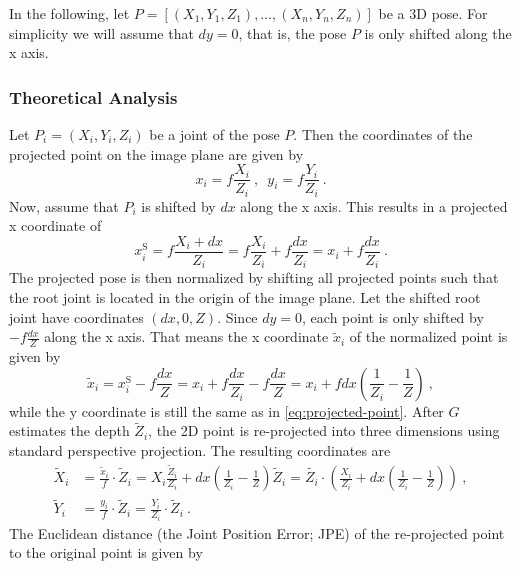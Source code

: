 In the following, let $P = [(X_1, Y_1, Z_1), \dotsc, (X_n, Y_n, Z_n)]$ be a 3D pose.
For simplicity we will assume that $dy = 0$, that is, the pose $P$ is only shifted along the x axis.

\subsubsection{Theoretical Analysis}
\label{sec:x-shift-error-theoretical}
Let $P_i = (X_i, Y_i, Z_i)$ be a joint of the pose $P$.
Then the coordinates of the projected point on the image plane are given by
\begin{equation}
	\label{eq:projected-point}
	x_i = f \frac{X_i}{Z_i} \ ,\enspace y_i = f \frac{Y_i}{Z_i} \ .
\end{equation}
Now, assume that $P_i$ is shifted by $dx$ along the x axis.
This results in a projected x coordinate of
\begin{equation}
	\label{eq:projected-x-y}
	x_i^\mathrm{S} = f \frac{X_i + dx}{Z_i} = f \frac{X_i}{Z_i} + f \frac{dx}{Z_i} = x_i + f \frac{dx}{Z_i}\ .
\end{equation}
The projected pose is then normalized by shifting all projected points such that the root joint is located in the origin of the image plane. 
Let the shifted root joint have coordinates $(dx, 0, Z)$.
Since $dy = 0$, each point is only shifted by $- f \frac{dx}{Z}$ along the x axis.
That means the x coordinate  $\widetilde{x}_i$ of the normalized point is given by
\begin{equation}
	\widetilde{x}_i
	= x_i^\mathrm{S} - f \frac{dx}{Z}
	= x_i + f \frac{dx}{Z_i} - f \frac{dx}{Z}
	= x_i + f dx \left (\frac{1}{Z_i} - \frac{1}{Z} \right) \ , 
\end{equation}
while the y coordinate is still the same as in \autoref{eq:projected-point}.
After $G$ estimates the depth $\widetilde{Z}_i$, the 2D point is re-projected into three dimensions using standard perspective projection. 
The resulting coordinates are 
\begin{align}
	\label{eq:re-projected-X}
	\widetilde{X}_i &= \frac{\widetilde{x}_i}{f} \cdot \widetilde{Z}_i
	= X_i \frac{\widetilde{Z}_i}{Z_i} + dx (\frac{1}{Z_i} - \frac{1}{Z}) \widetilde{Z}_i
	= \widetilde{Z_i} \cdot \left( \frac{X_i}{Z_i} + dx \left( \frac{1}{Z_i} - \frac{1}{Z} \right) \right) \ , \\
	\label{eq:re-projected-Y}
	\widetilde{Y}_i &= \frac{y_i}{f} \cdot \widetilde{Z}_i = \frac{Y_i}{Z_i} \cdot \widetilde{Z}_i \ .
\end{align}
The Euclidean distance (the Joint Position Error; JPE) of the re-projected point to the original point is given by
